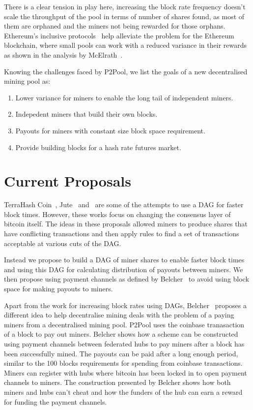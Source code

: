 \documentclass{article}
\begin{document}
There is a clear tension in play here, increasing the block rate
frequency doesn't scale the throughput of the pool in terms of number
of shares found, as most of them are orphaned and the miners not being
rewarded for those orphans. Ethereum's inclusive
protocols~\cite{inclusive-protocols} help alleviate the problem for
the Ethereum blockchain, where small pools can work with a reduced
variance in their rewards as shown in the analysis by
McElrath~\cite{mcelrath:variance}.

Knowing the challenges faced by P2Pool, we list the goals of a new
decentralised mining pool as:

\begin{enumerate}
  \item Lower variance for miners to enable the long tail of independent miners.
  \item Indepedent miners that build their own blocks.
  \item Payouts for miners with constant size block space requirement.
  \item Provide building blocks for a hash rate futures market.
\end{enumerate}

\section{Current Proposals}

TerraHash Coin~\cite{mcelrath:variance}, Jute~\cite{jute}
and~\cite{spectre} are some of the attempts to use a DAG for faster
block times. However, these works focus on changing the consensus
layer of bitcoin itself. The ideas in these proposals allowed miners
to produce shares that have conflicting transactions and then apply
rules to find a set of transactions acceptable at various cuts of the
DAG.\@

Instead we propose to build a DAG of miner shares to enable faster
block times and using this DAG for calculating distribution of payouts
between miners. We then propose using payment channels as defined by
Belcher~\cite{channels-for-rewards} to avoid using block space for
making payouts to miners.

Apart from the work for increasing block rates using DAGs,
Belcher~\cite{channels-for-rewards} proposes a different idea to help
decentralise mining deals with the problem of a paying miners from a
decentralised mining pool. P2Pool uses the coinbase tranasaction of a
block to pay out miners. Belcher shows how a scheme can be constructed
using payment channels between federated hubs to pay miners after a
block has been successfully mined. The payouts can be paid after a
long enough period, similar to the 100 blocks requirements for
spending from coinbase transactions. Miners can register with hubs
where bitcoin has been locked in to open payment channels to
miners. The construction presented by Belcher shows how both miners
and hubs can't cheat and how the funders of the hub can earn a reward
for funding the payment channels.
\end{document}

